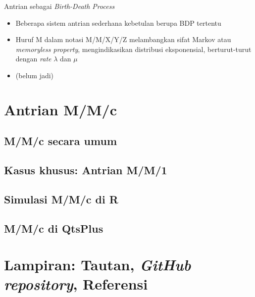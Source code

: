 \documentclass{beamer}
\begin{document}
\begin{frame}{Antrian sebagai \textit{Birth-Death Process}}
    \begin{itemize}
        \item Beberapa sistem antrian sederhana kebetulan berupa BDP tertentu
        \item Huruf M dalam notasi M/M/X/Y/Z melambangkan sifat Markov atau \textit{memoryless property}, mengindikasikan distribusi eksponensial, berturut-turut dengan \textit{rate} \(\lambda\) dan \(\mu\)
        \item (belum jadi)
    \end{itemize}
\end{frame}

\section{Antrian M/M/c}

\subsection{M/M/c secara umum}

\subsection{Kasus khusus: Antrian M/M/1}

\subsection{Simulasi M/M/c di R}

\subsection{M/M/c di QtsPlus}

\section{Lampiran: Tautan, \textit{GitHub repository}, Referensi}
\end{document}
